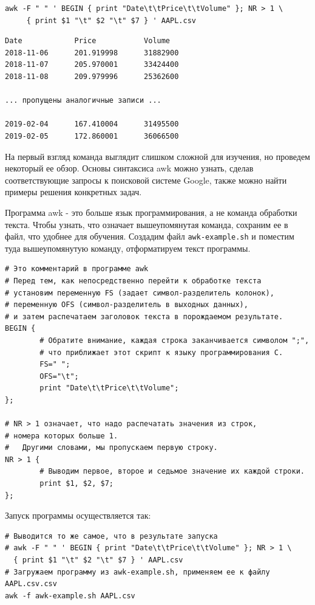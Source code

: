 \documentclass[12pt]{article}
\begin{document}
\begin{verbatim}
awk -F " " ' BEGIN { print "Date\t\tPrice\t\tVolume" }; NR > 1 \
     { print $1 "\t" $2 "\t" $7 } ' AAPL.csv
\end{verbatim}

\begin{verbatim}
Date            Price           Volume
2018-11-06      201.919998      31882900
2018-11-07      205.970001      33424400
2018-11-08      209.979996      25362600

... пропущены аналогичные записи ...

2019-02-04      167.410004      31495500
2019-02-05      172.860001      36066500
\end{verbatim}

На первый взгляд команда выглядит слишком сложной для изучения, но
проведем некоторый ее обзор. Основы синтаксиса awk можно узнать, сделав
соответствующие запросы к поисковой системе Google, также можно найти
примеры решения конкретных задач.

Программа awk - это больше язык программирования, а не команда обработки
текста. Чтобы узнать, что означает вышеупомянутая команда, сохраним ее в
файл, что удобнее для обучения. Создадим файл \texttt{awk-example.sh} и
поместим туда вышеупомянутую команду, отформатируем текст программы.

\begin{verbatim}
# Это комментарий в программе awk
# Перед тем, как непосредственно перейти к обработке текста
# установим переменную FS (задает символ-разделитель колонок),
# переменную OFS (символ-разделитель в выходных данных),
# и затем распечатаем заголовок текста в порождаемом результате.
BEGIN {
        # Обратите внимание, каждая строка заканчивается символом ";",
        # что приближает этот скрипт к языку программирования C.
        FS=" ";
        OFS="\t";
        print "Date\t\tPrice\t\tVolume";
};

# NR > 1 означает, что надо распечатать значения из строк,
# номера которых больше 1.
#   Другими словами, мы пропускаем первую строку.
NR > 1 {
        # Выводим первое, второе и седьмое значение их каждой строки.
        print $1, $2, $7;
};
\end{verbatim}

Запуск программы осуществляется так:

\begin{verbatim}
# Выводится то же самое, что в результате запуска
# awk -F " " ' BEGIN { print "Date\t\tPrice\t\tVolume" }; NR > 1 \
  { print $1 "\t" $2 "\t" $7 } ' AAPL.csv
# Загружаем программу из awk-example.sh, применяем ее к файлу AAPL.csv.csv
awk -f awk-example.sh AAPL.csv
\end{verbatim}
\end{document}
